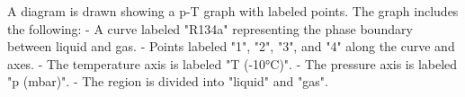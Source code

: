 A diagram is drawn showing a p-T graph with labeled points. The graph includes the following:  
- A curve labeled "R134a" representing the phase boundary between liquid and gas.  
- Points labeled "1", "2", "3", and "4" along the curve and axes.  
- The temperature axis is labeled "T (-10°C)".  
- The pressure axis is labeled "p (mbar)".  
- The region is divided into "liquid" and "gas".